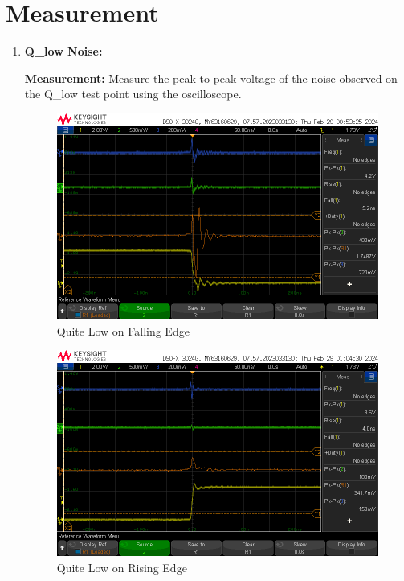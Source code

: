 \documentclass[a4paper,11pt]{article}%
\begin{document}
\section{Measurement}
\begin{enumerate}

	\item \textbf{Q\_low Noise:}

	\textbf{Measurement:} Measure the peak-to-peak voltage of the noise observed on the Q\_low test point using the oscilloscope.

	\begin{figure}[H]
		\centering
		\includegraphics[scale=0.6]{figures/ql_falling}
		\caption{Quite Low on Falling Edge}
	
	\end{figure}

	\begin{figure}[H]
		\centering
		\includegraphics[scale=0.6]{figures/low_rising}
		\caption{Quite Low on Rising Edge}
	

\end{figure}
\end{enumerate}
\end{document}
